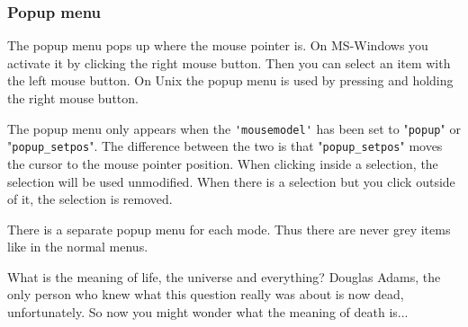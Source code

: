 \subsubsection{Popup menu}
The popup menu pops up where the mouse pointer is.
On MS-Windows you activate it by clicking the right mouse button.
Then you can select an item with the left mouse button.
On Unix the popup menu is used by pressing and holding the right mouse button.

The popup menu only appears when the \verb!'mousemodel'! has been set to "\verb!popup!" or "\verb!popup_setpos!".
The difference between the two is that "\verb!popup_setpos!" moves the cursor to the mouse pointer position.
When clicking inside a selection, the selection will be used unmodified.
When there is a selection but you click outside of it, the selection is removed.

There is a separate popup menu for each mode.
Thus there are never grey items like in the normal menus.

\label{42}
What is the meaning of life, the universe and everything?
Douglas Adams, the only person who knew what this question really was about is now dead, unfortunately.
So now you might wonder what the meaning of death is...
\clearpage
